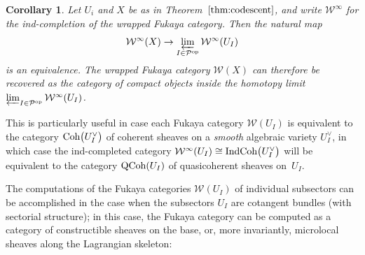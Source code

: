 \documentclass[10pt,a4paper]{amsart}
\numberwithin{equation}{section}
\newtheorem{Corollary}[Theorem]{Corollary}
\def\cW{\mathcal{W}}
\def\calP{\mathcal{P}}
\newcommand{\Coh}{\textup{Coh}}
\newcommand{\Ind}{\textup{Ind}}
\newcommand{\QCoh}{\textup{QCoh}}
\begin{document}
\begin{Corollary}\label{cor:descent}
 Let $U_i$ and $X$ be as in Theorem~$\ref{thm:codescent}$, and write $\cW^\infty$ for the ind-completion of the wrapped Fukaya category. Then the natural map
 \[
 \cW^\infty(X)\to\varprojlim_{I\in \calP^{\rm op}}\cW^\infty(U_I)
 \]
 is an equivalence. The wrapped Fukaya category $\cW(X)$ can therefore be recovered as the category of compact objects inside the homotopy limit $\varprojlim_{I\in \calP^{\rm op}}\cW^\infty(U_I)$.
\end{Corollary}
This is particularly useful in case each Fukaya category $\cW(U_I)$ is equivalent to the category $\Coh\big(U_I^\vee\big)$ of coherent sheaves on a {\em smooth} algebraic variety $U_I^\vee$, in which case the ind-completed category $\cW^\infty(U_I)\cong \Ind\Coh\big(U_I^\vee\big)$ will be equivalent to the category $\QCoh(U_I)$ of quasicoherent sheaves on~$U_I$.

The computations of the Fukaya categories $\cW(U_I)$ of individual subsectors can be accomplished in the case when the subsectors $U_I$ are cotangent bundles (with sectorial structure); in this case, the Fukaya category can be computed as a category of constructible sheaves on the base, or, more invariantly, microlocal sheaves along the Lagrangian skeleton:
\end{document}

